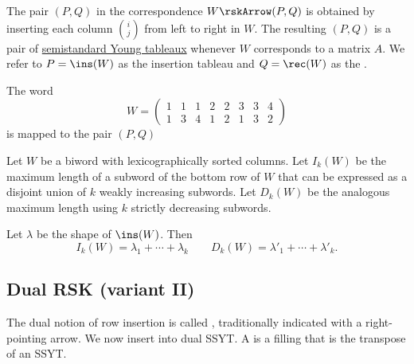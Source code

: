The pair $(P,Q)$ in the correspondence $W \rskArrow (P,Q)$ is obtained by
inserting each column $\binom{i}{j}$ from left to right in $W$.
The resulting $(P,Q)$ is a pair of
\hyperref[semistandardYoungTableau]{semistandard Young tableaux} whenever
$W$ corresponds to a matrix $A$.
We refer to $P = \ins(W)$ as the insertion tableau
and $Q=\rec(W)$ as the \label{recordingTableau}.

\begin{example}
The word
\begin{equation*}
W=
\begin{pmatrix}
1& 1& 1& 2& 2& 3& 3& 4 \\
1& 3& 4& 1& 2& 1& 3& 2
\end{pmatrix}
\end{equation*}
is mapped to the pair $(P,Q)$

\begin{figure}
\end{figure}

\end{example}


\begin{theorem}
Let $W$ be a biword with lexicographically sorted columns.
Let $I_k(W)$ be the maximum length of a subword of the bottom row of $W$
that can be expressed as a disjoint union of $k$ weakly increasing subwords.
Let $D_k(W)$ be the analogous maximum length using $k$ strictly decreasing
subwords.

Let $\lambda$ be the shape of $\ins(W)$. Then
\[
I_k(W) = \lambda_1+\dotsb + \lambda_k \qquad
D_k(W) = \lambda'_1+\dotsb + \lambda'_k.
\]
\end{theorem}


\subsection[rskDual]{Dual RSK (variant II)}


The dual notion of row insertion is called
\label{columnInsertion},
traditionally indicated with a right-pointing arrow.
We now insert into dual SSYT.
A \label{dualSSYT} is a filling that is the transpose of an SSYT.

